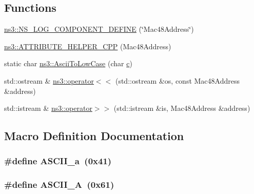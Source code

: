 \subsection*{Functions}
\begin{DoxyCompactItemize}
\item 
\hyperlink{namespacens3_a92a7b5063ec150e8daad6da795162a45}{ns3\+::\+N\+S\+\_\+\+L\+O\+G\+\_\+\+C\+O\+M\+P\+O\+N\+E\+N\+T\+\_\+\+D\+E\+F\+I\+NE} (\char`\"{}Mac48\+Address\char`\"{})
\item 
\hyperlink{namespacens3_a364c67d9205d7634eac7d0965c0db8c0}{ns3\+::\+A\+T\+T\+R\+I\+B\+U\+T\+E\+\_\+\+H\+E\+L\+P\+E\+R\+\_\+\+C\+PP} (Mac48\+Address)
\item 
static char \hyperlink{namespacens3_ae7934c60f6570d35f78e1b99577351a0}{ns3\+::\+Ascii\+To\+Low\+Case} (char \hyperlink{mmwave_2model_2fading-traces_2fading__trace__generator_8m_ae0323a9039add2978bf5b49550572c7c}{c})
\item 
std\+::ostream \& \hyperlink{namespacens3_aef1e371de8496ececd7c572e93be00ce}{ns3\+::operator$<$$<$} (std\+::ostream \&os, const Mac48\+Address \&address)
\item 
std\+::istream \& \hyperlink{namespacens3_a8463d7d59e31b87a21b43f176651d9fe}{ns3\+::operator$>$$>$} (std\+::istream \&is, Mac48\+Address \&address)
\end{DoxyCompactItemize}


\subsection{Macro Definition Documentation}
\subsubsection[{\texorpdfstring{A\+S\+C\+I\+I\+\_\+a}{ASCII_a}}]{\setlength{\rightskip}{0pt plus 5cm}\#define A\+S\+C\+I\+I\+\_\+a~(0x41)}\hypertarget{mac48-address_8cc_acb0c7653dabe53da8a7fb03bcad505e7}{}\label{mac48-address_8cc_acb0c7653dabe53da8a7fb03bcad505e7}
\subsubsection[{\texorpdfstring{A\+S\+C\+I\+I\+\_\+A}{ASCII_A}}]{\setlength{\rightskip}{0pt plus 5cm}\#define A\+S\+C\+I\+I\+\_\+A~(0x61)}\hypertarget{mac48-address_8cc_a6ccdee41712ed103021e82cb944f47e6}{}\label{mac48-address_8cc_a6ccdee41712ed103021e82cb944f47e6}
